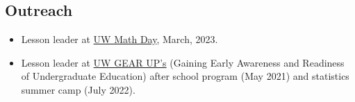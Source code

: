 \documentclass[margin, 10pt]{res}
\begin{document}
\begin{resume}
\section{Outreach}
\begin{itemize}
   \item Lesson leader at \href{https://math.washington.edu/events/2023-03-20/uw-math-day}{UW Math Day}, March, 2023. 
  \item Lesson leader at \href{https://depts.washington.edu/gearupac/}{UW GEAR UP's} (Gaining Early Awareness and Readiness of Undergraduate Education) after school program (May 2021) and statistics summer camp (July 2022). 
\end{itemize}
%
\end{resume}
\end{document}
